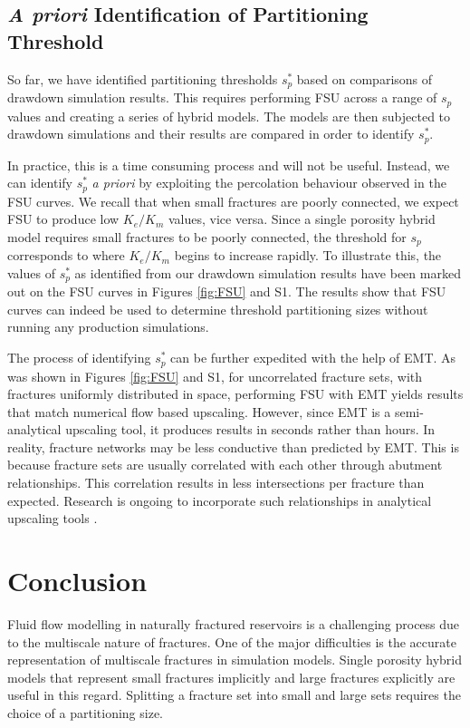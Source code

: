 \documentclass[draft]{agujournal2018}
\begin{document}
\subsection{\textit{A priori} Identification of Partitioning Threshold}
So far, we have identified partitioning thresholds $s_p^*$ based on comparisons of drawdown simulation results. This requires performing FSU across a range of $s_p$ values and creating a series of hybrid models. The models are then subjected to drawdown simulations and their results are compared in order to identify $s_p^*$.

In practice, this is a time consuming process and will not be useful. Instead, we can identify $s_p^*$ \textit{a priori} by exploiting the percolation behaviour observed in the FSU curves. We recall that when small fractures are poorly connected, we expect FSU to produce low $K_e/K_m$ values, vice versa. Since a single porosity hybrid model requires small fractures to be poorly connected, the threshold for $s_p$ corresponds to where $K_e/K_m$ begins to increase rapidly. To illustrate this, the values of $s_p^*$ as identified from our drawdown simulation results have been marked out on the FSU curves in Figures \ref{fig:FSU} and S1. The results show that FSU curves can indeed be used to determine threshold partitioning sizes without running any production simulations.

The process of identifying $s_p^*$ can be further expedited with the help of EMT. As was shown in Figures \ref{fig:FSU} and S1, for uncorrelated fracture sets, with fractures uniformly distributed in space, performing FSU with EMT yields results that match numerical flow based upscaling. However, since EMT is a semi-analytical upscaling tool, it produces results in seconds rather than hours. In reality, fracture networks may be less conductive than predicted by EMT. This is because fracture sets are usually correlated with each other through abutment relationships. This correlation results in less intersections per fracture than expected. Research is ongoing to incorporate such relationships in analytical upscaling tools \citep{Hardebol2015, Makel2007, Saevik2017}. 

\section{Conclusion}
Fluid flow modelling in naturally fractured reservoirs is a challenging process due to the multiscale nature of fractures. One of the major difficulties is the accurate representation of multiscale fractures in simulation models. Single porosity hybrid models that represent small fractures implicitly and large fractures explicitly are useful in this regard. Splitting a fracture set into small and large sets requires the choice of a partitioning size.
\end{document}
